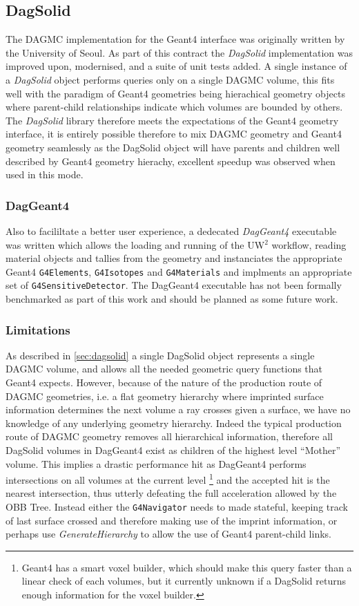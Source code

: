 \subsection{DagSolid}
\label{dagsolid}
The DAGMC implementation for the Geant4 interface was originally written by the University of Seoul. 
As part of this contract the \textit{DagSolid} implementation was improved upon, modernised,  and a 
suite of unit tests added. A single instance of a \textit{DagSolid} object performs queries only
on a single DAGMC volume, this fits well with the paradigm of Geant4 geometries being hierachical 
geometry objects where parent-child relationships indicate which volumes are bounded by others. 
The \textit{DagSolid} library therefore meets the expectations of the Geant4 geometry interface, it is
entirely possible therefore to mix DAGMC geometry and Geant4 geometry seamlessly as the DagSolid object
will have parents and children well described by Geant4 geometry hierachy, excellent speedup was observed
when used in this mode.
\subsubsection{DagGeant4}
Also to facililtate a better user experience, a dedecated \textit{DagGeant4}  
executable was written which allows the loading and running of the UW$^2$ workflow, 
reading material objects and tallies from the geometry and instanciates the appropriate Geant4 
\texttt{G4Elements}, \texttt{G4Isotopes} and \texttt{G4Materials} and implments an appropriate 
set of \texttt{G4SensitiveDetector}. The DagGeant4 executable has not been formally benchmarked
as part of this work and should be planned as some future work. 
\subsubsection{Limitations}
As described in \ref{sec:dagsolid} a single DagSolid object represents a single DAGMC volume, and allows
all the needed geometric query functions that Geant4 expects. However, because of the nature of the production
route of DAGMC geometries, i.e. a flat geometry hierarchy where imprinted surface information determines
the next volume a ray crosses given a surface, we have no knowledge of any underlying geometry hierarchy. 
Indeed the typical production route of DAGMC geometry removes all hierarchical information, therefore all 
DagSolid volumes in DagGeant4 exist as children of the highest level ``Mother'' volume. This implies a drastic
performance hit as DagGeant4 performs intersections on all volumes at the current level 
\footnote{Geant4 has a smart voxel builder, which should make this query faster than a linear check of 
each volumes, but it currently unknown if a DagSolid returns enough information for the voxel builder.}
and the accepted hit is the nearest intersection, thus utterly defeating the full acceleration allowed
by the OBB Tree. Instead either the \texttt{G4Navigator} needs to made stateful, keeping track of last surface
crossed and therefore making use of the imprint information, or perhaps use \textit{GenerateHierarchy} 
to allow the use of Geant4 parent-child links.
